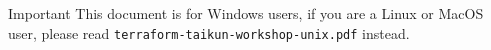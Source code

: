 \begin{important}{Important}
  This document is for Windows users, if you are a Linux or MacOS user, please read \texttt{terraform-taikun-workshop-unix.pdf} instead.
\end{important}
